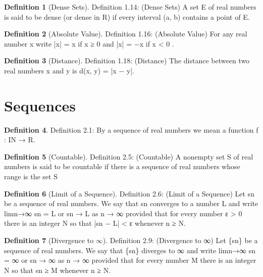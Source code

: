 \documentclass[11pt]{article}
\theoremstyle{definition}
\newtheorem{definition}{Definition}[section]
\begin{document}
\setcounter{definition}{13}
\begin{definition} [Dense Sets]
	Definition 1.14: (Dense Sets) A set E of real numbers is said to be dense (or dense in R) if every interval (a, b) contains a point of E.
\end{definition}

\setcounter{definition}{15}
\begin{definition} [Absolute Value]
	Definition 1.16: (Absolute Value) For any real number x write
	|x| = x if x ≥ 0
	and
	|x| = −x if x < 0 .
\end{definition}

\setcounter{definition}{17}
\begin{definition} [Distance]
	Definition 1.18: (Distance) The distance between two real numbers x and y is d(x, y) = |x − y|.
\end{definition}

\section{Sequences}

\begin{definition} 
	Definition 2.1: By a sequence of real numbers we mean a function f : IN → R.
\end{definition}

\setcounter{definition}{4}
\begin{definition} [Countable]
	Definition 2.5: (Countable) A nonempty set S of real numbers is said to be countable if there is a sequence of real numbers whose range is the set S
\end{definition}


\begin{definition} [Limit of a Sequence]
	Definition 2.6: (Limit of a Sequence) Let {sn} be a sequence of real numbers. We say that {sn}
	converges to a number L and write
	limn→∞
	sn = L
	or
	sn → L as n → ∞
	provided that for every number ε > 0 there is an integer N so that
	|sn − L| < ε
	whenever n ≥ N.
\end{definition}

\setcounter{definition}{8}
\begin{definition} [Divergence to $\infty$]
	Definition 2.9: (Divergence to ∞) Let \{sn\} be a sequence of real numbers. We say that \{sn\} diverges
	to ∞ and write
	limn→∞
	sn = ∞
	or
	sn → ∞ as n → ∞
	provided that for every number M there is an integer N so that
	sn ≥ M
	whenever n ≥ N.
\end{definition}
\end{document}
